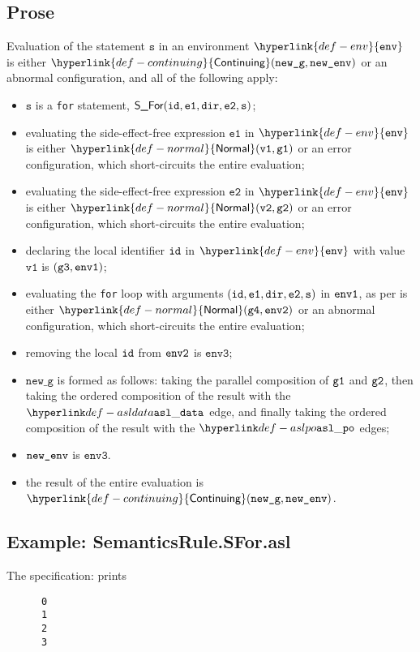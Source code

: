 \documentclass{book}
\newcommand\ProseOrAbnormal[0]{or an abnormal configuration, which short-circuits the entire evaluation}
\newcommand\ProseOrError[0]{or an error configuration, which short-circuits the entire evaluation}
\newcommand\Normal[0]{\hyperlink{def-normal}{\textsf{Normal}}}
\newcommand\Continuing[0]{\hyperlink{def-continuing}{\textsf{Continuing}}}
\newcommand\env[0]{\hyperlink{def-env}{\texttt{env}}}
\newcommand\envthree[0]{\texttt{env3}}
\newcommand\newg[0]{\texttt{new\_g}}
\newcommand\vs[0]{\texttt{s}}
\newcommand\vvone[0]{\texttt{v1}}
\newcommand\vvtwo[0]{\texttt{v2}}
\newcommand\veone[0]{\texttt{e1}}
\newcommand\vetwo[0]{\texttt{e2}}
\newcommand\vgthree[0]{\texttt{g3}}
\newcommand\vgfour[0]{\texttt{g4}}
\newcommand\dir[0]{\texttt{dir}}
\begin{document}
    \subsection{Prose}
    Evaluation of the statement $\vs$ in an environment $\env$ is
    either $\Continuing(\newg, \newenv)$ or an abnormal configuration,
    and all of the following apply:
    \begin{itemize}
    \item $\vs$ is a \texttt{for} statement, $\SFor(\id, \veone, \dir, \vetwo, \vs)$;
    \item evaluating the side-effect-free expression $\veone$ in $\env$ is either
    $\Normal(\vvone, \vgone)$ \ProseOrError;
    \item evaluating the side-effect-free expression $\vetwo$ in $\env$ is either
    $\Normal(\vvtwo, \vgtwo)$ \ProseOrError;
    \item declaring the local identifier $\texttt{id}$ in $\env$ with value $\vvone$ is $(\vgthree, \envone)$;
    \item evaluating the \texttt{for} loop with arguments $(\id, \veone, \dir, \vetwo, \vs)$ in $\texttt{env1}$,
    as per  is either $\Normal(\vgfour, \envtwo)$ \ProseOrAbnormal;
    \item removing the local $\texttt{id}$ from $\texttt{env2}$ is $\envthree$;
    \item $\newg$ is formed as follows: taking the parallel composition of $\texttt{g1}$ and $\texttt{g2}$,
    then taking the ordered composition of the result with the $\asldata$ edge,
    and finally taking the ordered composition of the result with the $\aslpo$ edges;
    \item $\texttt{new\_env}$ is $\envthree$.
    \item the result of the entire evaluation is $\Continuing(\newg, \newenv)$.
    \end{itemize}

    \subsection{Example: SemanticsRule.SFor.asl}
    The specification:
    prints
    \begin{Verbatim}
      0
      1
      2
      3
    \end{Verbatim}


\end{document}
